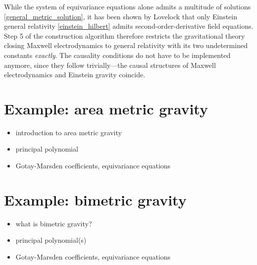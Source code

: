 While the system of equivariance equations alone admits a multitude of solutions \eqref{general_metric_solution}, it has been shown by Lovelock\cite{} that only Einstein general relativity \eqref{einstein_hilbert} admits second-order-derivative field equations. Step 5 of the construction algorithm therefore restricts the gravitational theory closing Maxwell electrodynamics to general relativity with its two undetermined constants \emph{exactly}. The causality conditions do not have to be implemented anymore, since they follow trivially---the causal structures of Maxwell electrodynamics and Einstein gravity coincide\cite{??}.

\section{Example: area metric gravity}
\begin{itemize}
\item introduction to area metric gravity
\item principal polynomial
\item Gotay-Marsden coefficients, equivariance equations
\end{itemize}

\section{Example: bimetric gravity}
\begin{itemize}
\item what is bimetric gravity?
\item principal polynomial(s)
\item Gotay-Marsden coefficients, equivariance equations
\end{itemize}

